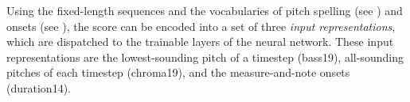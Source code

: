 
Using the fixed-length sequences and the vocabularies of
pitch spelling (see
) and onsets
(see
),
the score can be encoded into a set of three \emph{input
representations}, which are dispatched to the trainable
layers of the neural network. These input representations
are the lowest-sounding pitch of a timestep (\gls{bass19}),
all-sounding pitches of each timestep (\gls{chroma19}), and
the measure-and-note onsets (\gls{duration14}).
